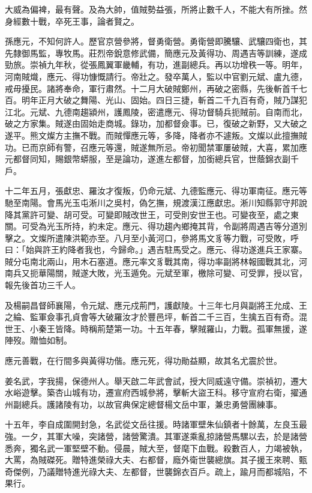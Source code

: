 \begin{pinyinscope}
大威為偏裨，最有聲。及為大帥，值賊勢益張，所將止數千人，不能大有所挫。然身經數十戰，卒死王事，論者賢之。

孫應元，不知何許人。歷官京營參將，督勇衛營。勇衛營即騰驤、武驤四衛也，其先隸御馬監，專牧馬。莊烈帝銳意修武備，簡應元及黃得功、周遇吉等訓練，遂成勁旅。崇禎九年秋，從張鳳翼軍畿輔，有功，進副總兵。再以功增秩一等。明年，河南賊熾，應元、得功慷慨請行。帝壯之。發卒萬人，監以中官劉元斌、盧九德，戒毋擾民。諸將奉命，軍行肅然。十二月大破賊鄭州，再破之密縣，先後斬首千七百。明年正月大破之舞陽、光山、固始。四日三捷，斬首二千九百有奇，賊乃謀犯江北。元斌、九德南趨潁州，護鳳陵，密遣應元、得功督騎兵扼賊前。自南而北，破之方家集。賊遂由固始走商城。錄功，加都督僉事。已，復破之新野，又大破之遂平。熊文燦方主撫不戰。而賊憚應元等，多降，降者亦不遽叛。文燦以此擅撫賊功。已而京師有警，召應元等還，賊遂無所忌。帝初聞禁軍屢破賊，大喜，累加應元都督同知，賜銀幣蟒服，至是論功，遂進左都督，加銜總兵官，世蔭錦衣副千戶。

十二年五月，張獻忠、羅汝才復叛，仍命元斌、九德監應元、得功軍南征。應元等馳至南陽。會馬光玉屯淅川之吳村，偽乞撫，規渡漢江應獻忠。淅川知縣郭守邦說降其黨許可變、胡可受。可變即賊改世王，可受則安世王也。可變夜至，處之東關。可受為光玉所持，約未定。應元、得功趨內鄉掩其背，令副將周遇吉等分道別擊之。文燦所遣陳洪範亦至。八月至小黃河口，參將馬文豸等力戰，可受敗，呼曰：「始與許王約降者我也，今歸命。」遇吉駐馬受之。應元、得功遂進兵王家寨。賊分屯南北兩山，用木石塞道。應元率文豸戰其南，得功率副將林報國戰其北，河南兵又扼華陽關，賊遂大敗，光玉遁免。元斌至軍，檄除可變、可受罪，授以官，報先後首功三千人。

及楊嗣昌督師襄陽，令元斌、應元戍荊門，護獻陵。十三年七月與副將王允成、王之綸、監軍僉事孔貞會等大破羅汝才於豐邑坪，斬首二千三百，生擒五百有奇。混世王、小秦王皆降。時稱荊楚第一功。十五年春，擊賊羅山，力戰。孤軍無援，遂陣歿。贈恤如制。

應元善戰，在行間多與黃得功偕。應元死，得功勛益顯，故其名尤震於世。

姜名武，字我揚，保德州人。舉天啟二年武會試，授大同威遠守備。崇禎初，遷大水峪遊擊。築杏山城有功，遷宣府西城參將，擊斬大盜王科。移守宣府右衛，擢通州副總兵。護諸陵有功，以故官典保定總督楊文岳中軍，兼忠勇營團練事。

十五年，李自成圍開封急，名武從文岳往援。時諸軍壁朱仙鎮者十餘萬，左良玉最強。一夕，其軍大噪，突諸營，諸營驚潰。其軍遂乘亂掠諸營馬騾以去，於是諸營悉奔，獨名武一軍堅壁不動。侵晨，賊大至，督麾下血戰。殺數百人，力竭被執，大罵，為賊磔死。贈特進榮祿大夫、右都督，廕外衛世襲總旗。其子援王來聘、甄奇傑例，乃議贈特進光祿大夫、左都督，世襲錦衣百戶。疏上，踰月而都城陷，不果行。


\end{pinyinscope}
